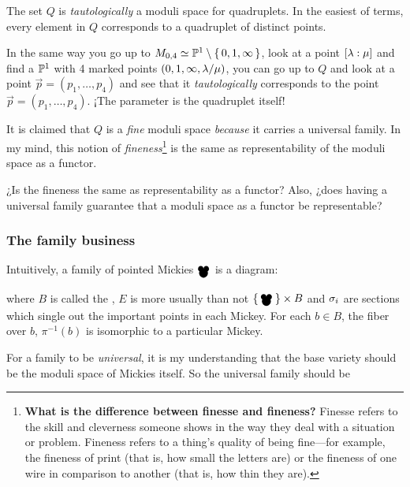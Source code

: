 \documentclass[12pt]{memoir}
\newcommand{\Mickey}{\pre{\raisebox{-1mm}{\scalebox{1.3}{\ensuremath\bullet}}}\hspace{-1.8 mm}{\raisebox{-1.65mm}{\scalebox{2.1}{\ensuremath\bullet}}}^{\hspace{-2.1mm}\raisebox{-1mm}{\scalebox{1.3}{\ensuremath\bullet}}}}
\begin{document}
The set $Q$ is \emph{tautologically} a moduli space for quadruplets. In the easiest of terms, every element in $Q$ corresponds to a quadruplet of distinct points.\par
In the same way you go up to $M_{0,4}\simeq\mathbb{P}^1\setminus\{\,0,1,\infty\,\}$, look at a point $[\lambda:\mu]$ and find a $\mathbb{P}^1$ with 4 marked points $(0,1,\infty,\lambda/\mu)$, you can go up to $Q$ and look at a point $\vec{p}=(p_1,\dots,p_4)$ and see that it \emph{tautologically} corresponds to the point $\vec p=(p_1,\dots,p_4)$. ¡The parameter is the quadruplet itself!\par 
It is claimed that $Q$ is a \emph{fine} moduli space \emph{because} it carries a universal family. In my mind, this notion of \emph{fineness}\footnote{\textbf{What is the difference between finesse and fineness?}
Finesse refers to the skill and cleverness someone shows in the way they deal with a situation or problem. Fineness refers to a thing's quality of being fine—for example, the fineness of print (that is, how small the letters are) or the fineness of one wire in comparison to another (that is, how thin they are).} is the same as representability of the moduli space as a functor. 

\begin{Ej}
    ¿Is the fineness the same as representability as a functor? Also, ¿does having a universal family guarantee that a moduli space as a functor be representable?
\end{Ej}

\subsubsection{The family business}

Intuitively, a family of pointed Mickies $\Mickey$ is a diagram:
\begin{figure}[h!]
    \centering
{}
    \label{fig-example-family-diagram}
\end{figure}
where $B$ is called the , $E$ is more usually than not $\set{\Mickey}\x B$ and $\sigma_i$ are sections which single out the important points in each Mickey. For each $b\in B$, the fiber over $b$, $\pi^{-1}(b)$ is isomorphic to a particular Mickey.\par 
For a family to be \emph{universal}, it is my understanding that the base variety should be the moduli space of Mickies itself. So the universal family should be 
\end{document}
